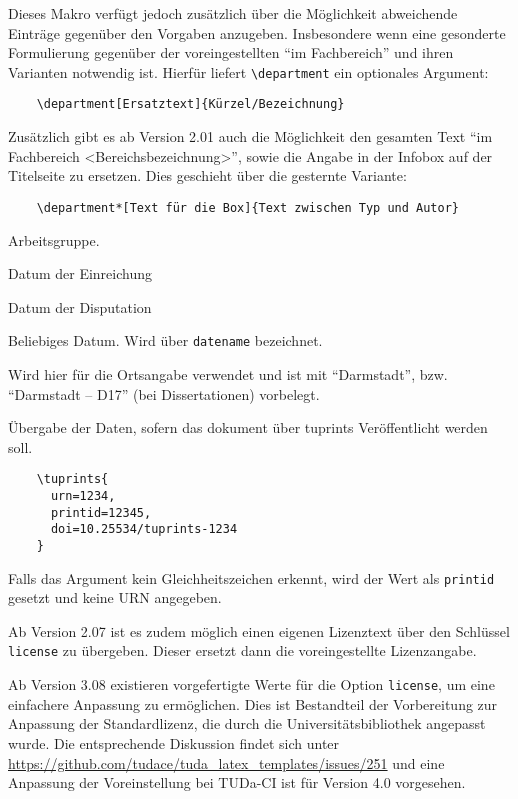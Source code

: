 \documentclass[
	ngerman,
	ruledheaders=chapter,%
	class=book,%
	thesis={
		type=dr,
		dr=rernat
	},
	accentcolor=9c,%
	custommargins=true,%
	marginpar=false,%
	fontsize=11pt,%
]{tudapub}
\let\code\texttt
\begin{document}
\begin{description}
	Dieses Makro verfügt jedoch zusätzlich über die Möglichkeit abweichende Einträge gegenüber den Vorgaben anzugeben. Insbesondere wenn eine gesonderte Formulierung gegenüber der voreingestellten \enquote{im Fachbereich} und ihren Varianten notwendig ist. Hierfür liefert \code{\textbackslash{}department} ein optionales Argument:

	\begin{verbatim}
	\department[Ersatztext]{Kürzel/Bezeichnung}
	\end{verbatim}
	Zusätzlich gibt es ab Version 2.01 auch die Möglichkeit den gesamten Text \enquote{im Fachbereich <Bereichsbezeichnung>}, sowie die Angabe in der Infobox auf der Titelseite zu ersetzen. Dies geschieht über die gesternte Variante:
	\begin{verbatim}
	\department*[Text für die Box]{Text zwischen Typ und Autor}
	\end{verbatim}
	\item[group] Arbeitsgruppe.
	\item[submissiondate] Datum der Einreichung
	\item[examdate] Datum der Disputation
	\item[date] Beliebiges Datum. Wird über \verb|datename| bezeichnet.
	\item[publishers] Wird hier für die Ortsangabe verwendet und ist mit \enquote{Darmstadt}, bzw. \enquote{Darmstadt -- D17} (bei Dissertationen) vorbelegt.
	\item[tuprints] \label{page:tuprints}Übergabe der Daten, sofern das dokument über tuprints Veröffentlicht werden soll.
	\begin{verbatim}
	\tuprints{
	  urn=1234,
	  printid=12345,
	  doi=10.25534/tuprints-1234
	}
	\end{verbatim}
	Falls das Argument kein Gleichheitszeichen erkennt, wird der Wert als \code{printid} gesetzt und keine URN angegeben.

	Ab Version 2.07 ist es zudem möglich einen eigenen Lizenztext über den Schlüssel \verb|license| zu übergeben. Dieser ersetzt dann die voreingestellte Lizenzangabe.

	Ab Version 3.08 existieren vorgefertigte Werte für die Option \verb|license|, um eine einfachere Anpassung zu ermöglichen.
	Dies ist Bestandteil der Vorbereitung zur Anpassung der Standardlizenz, die durch die Universitätsbibliothek angepasst wurde.
	Die entsprechende Diskussion findet sich unter \url{https://github.com/tudace/tuda_latex_templates/issues/251} und eine Anpassung der Voreinstellung bei TUDa-CI ist für Version 4.0 vorgesehen.


\end{description}
\end{document}
